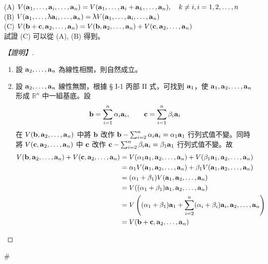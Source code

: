 \begin{theorem}\label{thm:b6s-1-app2}
(A) $V(\vect{a}_1, \dots, \vect{a}_i, \dots, \vect{a}_n) = V(\vect{a}_1, \dots, \vect{a}_i + \vect{a}_k, \dots, \vect{a}_n), \quad k \ne i, i=1, 2, \dots, n$ \\
(B) $V(\vect{a}_1, \dots, \lambda\vect{a}_i, \dots, \vect{a}_n) = \lambda V(\vect{a}_1, \dots, \vect{a}_i, \dots, \vect{a}_n)$ \\
(C) $V(\vect{b}+\vect{c}, \vect{a}_2, \dots, \vect{a}_n) = V(\vect{b}, \vect{a}_2, \dots, \vect{a}_n) + V(\vect{c}, \vect{a}_2, \dots, \vect{a}_n)$ \\
試證 (C) 可以從 (A), (B) 得到。
\end{theorem}

\begin{proof}[【證明】]
\begin{enumerate}[label=(\roman*), leftmargin=2em]
  \item 設 $\vect{a}_2, \dots, \vect{a}_n$ 為線性相關，則自然成立。
  \item 設 $\vect{a}_2, \dots, \vect{a}_n$ 線性無關，根據 § I-1 丙部 II 式，可找到 $\vect{a}_1$，使 $\vect{a}_1, \vect{a}_2, \dots, \vect{a}_n$ 形成 $\mathbb{R}^n$ 中一組基底。設
  \begin{equation}
  \vect{b} = \sum_{i=1}^n \alpha_i \vect{a}_i, \qquad \vect{c} = \sum_{i=1}^n \beta_i \vect{a}_i \label{eq:b6s-1-app2-1}
  \end{equation}
  在 $V(\vect{b}, \vect{a}_2, \dots, \vect{a}_n)$ 中將 $\vect{b}$ 改作 $\vect{b} - \sum_{i=2}^n \alpha_i \vect{a}_i = \alpha_1\vect{a}_1$ 行列式值不變。同時將 $V(\vect{c}, \vect{a}_2, \dots, \vect{a}_n)$ 中 $\vect{c}$ 改作 $\vect{c} - \sum_{i=2}^n \beta_i \vect{a}_i = \beta_1\vect{a}_1$ 行列式值不變。故
  \begin{align*}
  V(\vect{b}, \vect{a}_2, \dots, \vect{a}_n) + V(\vect{c}, \vect{a}_2, \dots, \vect{a}_n) &= V(\alpha_1\vect{a}_1, \vect{a}_2, \dots, \vect{a}_n) + V(\beta_1\vect{a}_1, \vect{a}_2, \dots, \vect{a}_n) \\
  &= \alpha_1 V(\vect{a}_1, \vect{a}_2, \dots, \vect{a}_n) + \beta_1 V(\vect{a}_1, \vect{a}_2, \dots, \vect{a}_n) \\
  &= (\alpha_1 + \beta_1) V(\vect{a}_1, \vect{a}_2, \dots, \vect{a}_n) \\
  &= V((\alpha_1 + \beta_1)\vect{a}_1, \vect{a}_2, \dots, \vect{a}_n) \\
  &= V\left((\alpha_1 + \beta_1)\vect{a}_1 + \sum_{i=2}^n (\alpha_i + \beta_i)\vect{a}_i, \vect{a}_2, \dots, \vect{a}_n\right) \\
  &= V(\vect{b}+\vect{c}, \vect{a}_2, \dots, \vect{a}_n)
  \end{align*}
\end{enumerate}
\end{proof}\hfill$\#$
